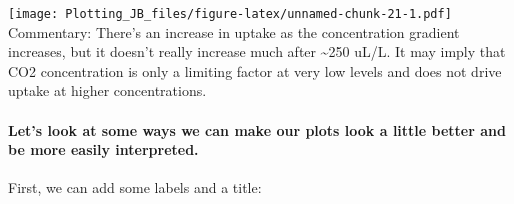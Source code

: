\documentclass[]{article}
\newenvironment{Shaded}{\begin{snugshade}}{\end{snugshade}}
\newcommand{\DataTypeTok}[1]{\textcolor[rgb]{0.13,0.29,0.53}{#1}}
\newcommand{\DecValTok}[1]{\textcolor[rgb]{0.00,0.00,0.81}{#1}}
\newcommand{\FloatTok}[1]{\textcolor[rgb]{0.00,0.00,0.81}{#1}}
\newcommand{\KeywordTok}[1]{\textcolor[rgb]{0.13,0.29,0.53}{\textbf{#1}}}
\newcommand{\NormalTok}[1]{#1}
\newcommand{\OperatorTok}[1]{\textcolor[rgb]{0.81,0.36,0.00}{\textbf{#1}}}
\newcommand{\StringTok}[1]{\textcolor[rgb]{0.31,0.60,0.02}{#1}}
\let\oldparagraph\paragraph
\renewcommand{\paragraph}[1]{\oldparagraph{#1}\mbox{}}
\begin{document}
\begin{Shaded}
\end{Shaded}

\texttt{[image: Plotting\_JB\_files/figure-latex/unnamed-chunk-21-1.pdf]}
Commentary: There's an increase in uptake as the concentration gradient
increases, but it doesn't really increase much after
\textasciitilde{}250 uL/L. It may imply that CO2 concentration is only a
limiting factor at very low levels and does not drive uptake at higher
concentrations.

\hypertarget{lets-look-at-some-ways-we-can-make-our-plots-look-a-little-better-and-be-more-easily-interpreted.}{%
\paragraph{Let's look at some ways we can make our plots look a little
better and be more easily
interpreted.}\label{lets-look-at-some-ways-we-can-make-our-plots-look-a-little-better-and-be-more-easily-interpreted.}}

First, we can add some labels and a title:

\begin{Shaded}
\end{Shaded}
\end{document}
